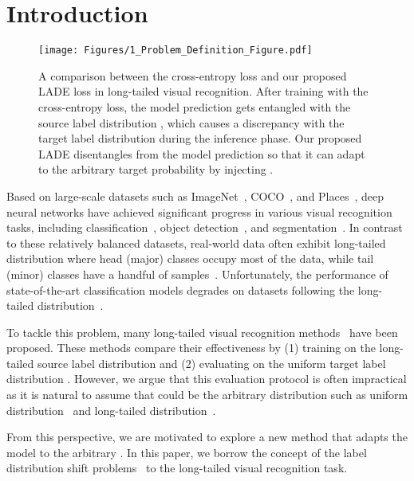 \documentclass[final]{cvpr}
\begin{document}
\section{Introduction}\label{sec:1_introduction}
\begin{figure}
\centering
\begin{center}
\texttt{[image: Figures/1\_Problem\_Definition\_Figure.pdf]}
\end{center}
\caption{
A comparison between the cross-entropy loss and our proposed LADE loss in long-tailed visual recognition.
After training with the cross-entropy loss, the model prediction gets entangled with the source label distribution , which causes a discrepancy with the target label distribution  during the inference phase.
Our proposed LADE disentangles  from the model prediction so that it can adapt to the arbitrary target probability by injecting .
}
\label{fig:1_problem_definition}
\end{figure} Based on large-scale datasets such as ImageNet~\cite{russakovsky2015imagenet}, COCO~\cite{lin2014microsoft}, and Places~\cite{zhou2017places}, deep neural networks have achieved significant progress in various visual recognition tasks, including classification~\cite{he2016deep,simonyan2014very}, object detection~\cite{ren2015faster,girshick2015fast}, and segmentation~\cite{ronneberger2015u}.
In contrast to these relatively balanced datasets, real-world data often exhibit long-tailed distribution where head (major) classes occupy most of the data, while tail (minor) classes have a handful of samples~\cite{van2017devil,liu2019large}.
Unfortunately, the performance of state-of-the-art classification models degrades on datasets following the long-tailed distribution~\cite{buda2018systematic,he2009learning,wang2017learning}.

To tackle this problem, many long-tailed visual recognition methods~\cite{buda2018systematic,he2009learning,japkowicz2002class,byrd2019effect,shen2016relay,yang2020rethinking,cao2019learning} have been proposed.
These methods compare their effectiveness by (1) training on the long-tailed source label distribution  and (2) evaluating on the uniform target label distribution .
However, we argue that this evaluation protocol is often impractical as it is natural to assume that  could be the arbitrary distribution such as uniform distribution~\cite{russakovsky2015imagenet} and long-tailed distribution~\cite{geras2017high,carreira2018short}.

From this perspective, we are motivated to explore a new method that adapts the model to the arbitrary .
In this paper, we borrow the concept of the label distribution shift problems~\cite{garg2020unified,lipton2018detecting,tian2020posterior} to the long-tailed visual recognition task.
\end{document}
